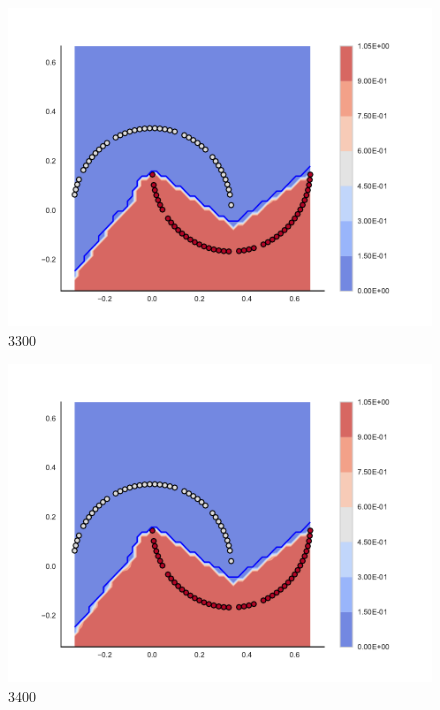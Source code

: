 \begin{subfigure}[b]{0.09\textwidth}
    \includegraphics[clip, trim=2.35cm 1.75cm 4.5cm 0cm,width=\textwidth]{img/convergence/3300.pdf}
    \caption{3300}
    \label{fig:convergence_3300}
\end{subfigure}
%
\begin{subfigure}[b]{0.09\textwidth}
    \includegraphics[clip, trim=2.35cm 1.75cm 4.5cm 0cm,width=\textwidth]{img/convergence/3400.pdf}
    \caption{3400}
    \label{fig:convergence_3400}
\end{subfigure}
%
